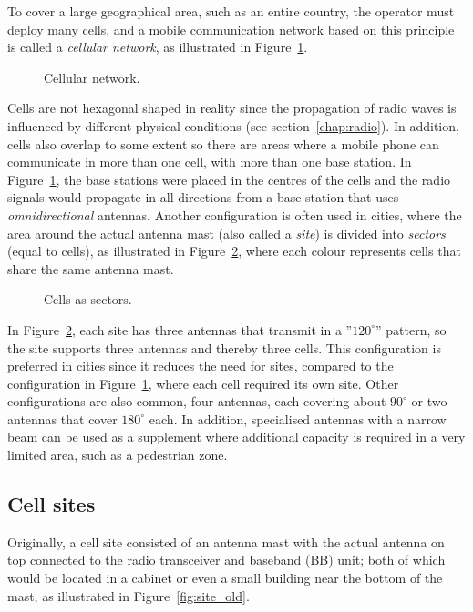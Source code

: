 To cover a large geographical area, such as an entire country, the operator must deploy many cells, and a mobile communication network based on this principle is called a \emph{cellular network}, as illustrated in Figure~\ref{fig:cellular}.
\begin{figure}[htbp]
\centering
{}
\caption{\label{fig:cellular}Cellular network.}
\end{figure}

Cells are not hexagonal shaped in reality since the propagation of radio waves is influenced by different physical conditions (see section~\ref{chap:radio}). In addition, cells also overlap to some extent so there are areas where a mobile phone can communicate in more than one cell, \ie with more than one base station. In Figure~\ref{fig:cellular}, the base stations were placed in the centres of the cells and the radio signals would propagate in all directions from a base station that uses \emph{omnidirectional} antennas. Another configuration is often used in cities, where the area around the actual antenna mast (also called a \emph{site}) is divided into \emph{sectors} (equal to cells), as illustrated in Figure~\ref{fig:sectorized_3}, where each colour represents cells that share the same antenna mast.
\begin{figure}[htbp]
\centering
{}
\caption{\label{fig:sectorized_3}Cells as sectors.}
\end{figure}

In Figure~\ref{fig:sectorized_3}, each site has three antennas that transmit in a ''$120^\circ$'' pattern, so the site supports three antennas and thereby three cells. This configuration is preferred in cities since it reduces the need for sites, compared to the configuration in Figure~\ref{fig:cellular}, where each cell required its own site. Other configurations are also common, \eg four antennas, each covering about $90^\circ$ or two antennas that cover $180^\circ$ each. In addition, specialised antennas with a narrow beam can be used as a supplement where additional capacity is required in a very limited area, such as a pedestrian zone.

\subsection{Cell sites}
Originally, a cell site consisted of an antenna mast with the actual antenna on top connected to the radio transceiver and baseband (BB) unit; both of which would be located in a cabinet or even a small building near the bottom of the mast, as illustrated in Figure~\ref{fig:site_old}.

